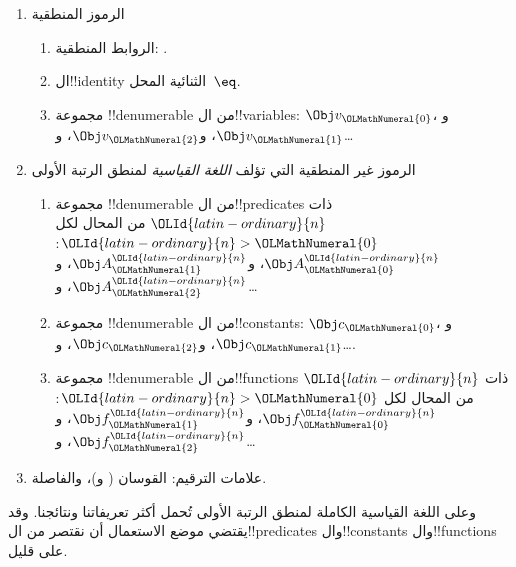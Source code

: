\documentclass[../../../include/open-logic-section]{subfiles}
\begin{document}
\begin{enumerate}
\item الرموز المنطقية
\begin{enumerate}
\item الروابط المنطقية:
  \startycommalist
  .
\item ال!!{identity} الثنائية المحل~$\eq$.
\item مجموعة !!{denumerable} من ال!!{variable}s: $\Obj v_{\OLMathNumeral{0}}$، و$\Obj v_{\OLMathNumeral{1}}$، و$\Obj
  v_{\OLMathNumeral{2}}$، و\dots
\end{enumerate}
\item الرموز غير المنطقية التي تؤلف \emph{اللغة القياسية} لمنطق
  الرتبة الأولى
\begin{enumerate}
\item مجموعة !!{denumerable} من ال!!{predicate}s ذات ${\OLId{latin-ordinary}{n}}$ من المحال لكل
  ${\OLId{latin-ordinary}{n}}>{\OLMathNumeral{0}}$: $\Obj A^{\OLId{latin-ordinary}{n}}_{\OLMathNumeral{0}}$، و$\Obj A^{\OLId{latin-ordinary}{n}}_{\OLMathNumeral{1}}$، و$\Obj A^{\OLId{latin-ordinary}{n}}_{\OLMathNumeral{2}}$، و\dots
\item مجموعة !!{denumerable} من ال!!{constant}s: $\Obj c_{\OLMathNumeral{0}}$، و$\Obj c_{\OLMathNumeral{1}}$، و$\Obj
  c_{\OLMathNumeral{2}}$، و\dots.
\item مجموعة !!{denumerable} من ال!!{function}s ذات ${\OLId{latin-ordinary}{n}}$ من المحال لكل
  ${\OLId{latin-ordinary}{n}}>{\OLMathNumeral{0}}$: $\Obj f^{\OLId{latin-ordinary}{n}}_{\OLMathNumeral{0}}$، و$\Obj f^{\OLId{latin-ordinary}{n}}_{\OLMathNumeral{1}}$، و$\Obj f^{\OLId{latin-ordinary}{n}}_{\OLMathNumeral{2}}$، و\dots
\end{enumerate}
\item علامات الترقيم: القوسان ( و)، والفاصلة.
\end{enumerate}

وعلى اللغة القياسية الكاملة لمنطق الرتبة الأولى تُحمل أكثر
تعريفاتنا ونتائجنا. وقد يقتضي موضع الاستعمال أن نقتصر من
ال!!{predicate}s وال!!{constant}s وال!!{function}s على قليل.
\end{document}
